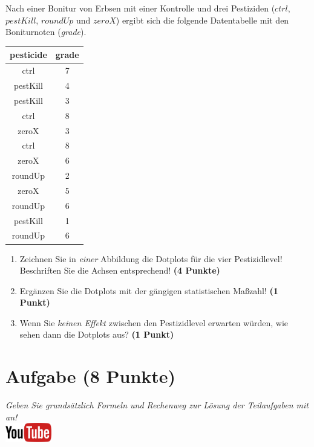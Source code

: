 \documentclass[a4paper, 9pt]{scrartcl}\usepackage[]{graphicx}\usepackage[]{xcolor}
\begin{document}
Nach einer Bonitur von Erbsen mit einer Kontrolle und drei
Pestiziden ($ctrl$, $pestKill$, $roundUp$ und $zeroX$) ergibt sich die
folgende Datentabelle mit den Boniturnoten (\textit{grade}).

\begin{table}[!h]
\centering
\begin{tabular}{cc}
\toprule
pesticide & grade\\
\midrule
ctrl & 7\\
pestKill & 4\\
pestKill & 3\\
ctrl & 8\\
zeroX & 3\\
\addlinespace
ctrl & 8\\
zeroX & 6\\
roundUp & 2\\
zeroX & 5\\
roundUp & 6\\
\addlinespace
pestKill & 1\\
roundUp & 6\\
\bottomrule
\end{tabular}
\end{table}



\begin{enumerate}
\item Zeichnen Sie in \textit{einer} Abbildung die Dotplots f{\"u}r die
  vier Pestizidlevel! Beschriften Sie die Achsen entsprechend!
  \textbf{(4 Punkte)}
\item Erg{\"a}nzen Sie die Dotplots mit der g{\"a}ngigen
  statistischen Ma{\ss}zahl! \textbf{(1 Punkt)}
\item Wenn Sie \textit{keinen Effekt} zwischen den Pestizidlevel erwarten
  w{\"u}rden, wie sehen dann die Dotplots aus? \textbf{(1 Punkt)}
\end{enumerate} 
\clearpage

\section{Aufgabe \hfill (8 Punkte)}

\textit{Geben Sie grunds{\"a}tzlich Formeln und Rechenweg zur L{\"o}sung der
  Teilaufgaben mit an!} \\[1Ex]

\hfill\href{https://youtu.be/t_1KL77mfmg}{\includegraphics[width =
  2cm]{img/youtube}}\\[1Ex]
\end{document}
